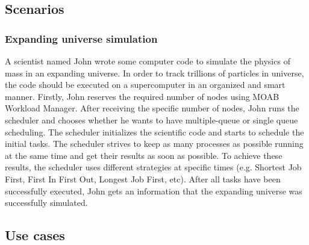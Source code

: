 \subsection{Scenarios}
			
\subsubsection{Expanding universe simulation}

A scientist named John wrote some computer code to simulate the physics of mass in an expanding universe. In order to track trillions of particles in universe, the code should be executed on a supercomputer in an organized and smart manner. 
Firstly, John reserves the required number of nodes using MOAB Workload Manager. After receiving the specific number of nodes, John runs the scheduler and chooses whether he wants to have multiple-queue or single queue scheduling. The scheduler initializes the scientific code and starts to schedule the initial tasks. The scheduler strives to keep as many processes as possible running at the same time and get
their results as soon as possible. To achieve these results, the scheduler uses different strategies at specific times (e.g. Shortest Job First, First In First Out, Longest Job First, etc). After all tasks have been successfully executed, John gets an information that the expanding universe was successfully simulated. 

\subsection{Use cases}

